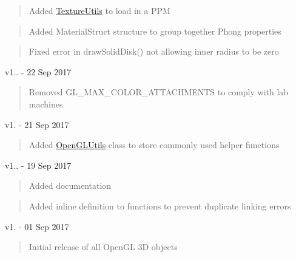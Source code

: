 \begin{quote}
Added \mbox{\hyperlink{namespace_texture_utils}{Texture\+Utils}} to load in a PPM \end{quote}
\begin{quote}
Added Material\+Struct structure to group together Phong properties \end{quote}
\begin{quote}
Fixed error in draw\+Solid\+Disk() not allowing inner radius to be zero \end{quote}
v1.. -\/ 22 Sep 2017 \begin{quote}
Removed GL\+\_\+\+MAX\+\_\+\+COLOR\+\_\+\+ATTACHMENTS to comply with lab machines \end{quote}
v1. -\/ 21 Sep 2017 \begin{quote}
Added \mbox{\hyperlink{namespace_open_g_l_utils}{Open\+GLUtils}} class to store commonly used helper functions \end{quote}
v1.. -\/ 19 Sep 2017 \begin{quote}
Added documentation \end{quote}
\begin{quote}
Added inline definition to functions to prevent duplicate linking errors \end{quote}
v1. -\/ 01 Sep 2017 \begin{quote}
Initial release of all Open\+GL 3D objects \end{quote}
